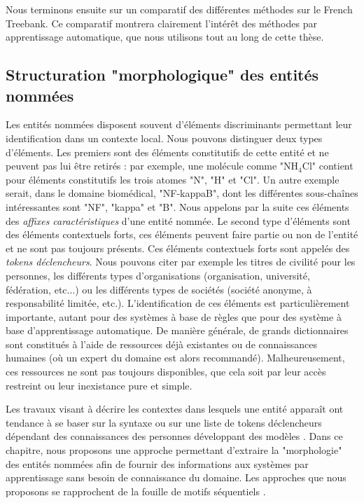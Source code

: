 \documentclass[PhD-Yoann-Dupont.tex]{subfiles}
\begin{document}
Nous terminons ensuite sur un comparatif des différentes méthodes sur le French Treebank. Ce comparatif montrera clairement l'intérêt des méthodes par apprentissage automatique, que nous utilisons tout au long de cette thèse.

\subsection*{Structuration "morphologique" des entités nommées}

Les entités nommées disposent souvent d'éléments discriminants permettant leur identification dans un contexte local. Nous pouvons distinguer deux types d'éléments. Les premiers sont des éléments constitutifs de cette entité et ne peuvent pas lui être retirés : par exemple, une molécule comme "NH$_{4}$Cl" contient pour éléments constitutifs les trois atomes "N", "H" et "Cl". Un autre exemple serait, dans le domaine biomédical, "NF-kappaB", dont les différentes sous-chaînes intéressantes sont "NF", "kappa" et "B". Nous appelons par la suite ces éléments des \emph{affixes caractéristiques} d'une entité nommée. Le second type d'éléments sont des éléments contextuels forts, ces éléments peuvent faire partie ou non de l'entité et ne sont pas toujours présents. Ces éléments contextuels forts sont appelés des \emph{tokens déclencheurs}. Nous pouvons citer par exemple les titres de civilité pour les personnes, les différents types d'organisations (organisation, université, fédération, etc...) ou les différents types de sociétés (société anonyme, à responsabilité limitée, etc.). L'identification de ces éléments est particulièrement importante, autant pour des systèmes à base de règles que pour des système à base d'apprentissage automatique. De manière générale, de grands dictionnaires sont constitués à l'aide de ressources déjà existantes ou de connaissances humaines (où un expert du domaine est alors recommandé). Malheureusement, ces ressources ne sont pas toujours disponibles, que cela soit par leur accès restreint ou leur inexistance pure et simple.

Les travaux visant à décrire les contextes dans lesquels une entité apparaît ont tendance à se baser sur la syntaxe \citep{holat2016fouille} ou sur une liste de tokens déclencheurs dépendant des connaissances des personnes développant des modèles \citep{leaman2013ncbi}. Dans ce chapitre, nous proposons une approche permettant d'extraire la "morphologie" des entités nommées afin de fournir des informations aux systèmes par apprentissage sans besoin de connaissance du domaine. Les approches que nous proposons se rapprochent de la fouille de motifs séquentiels \citep{agrawal1995mining,cellier2010fouille}.
\end{document}
